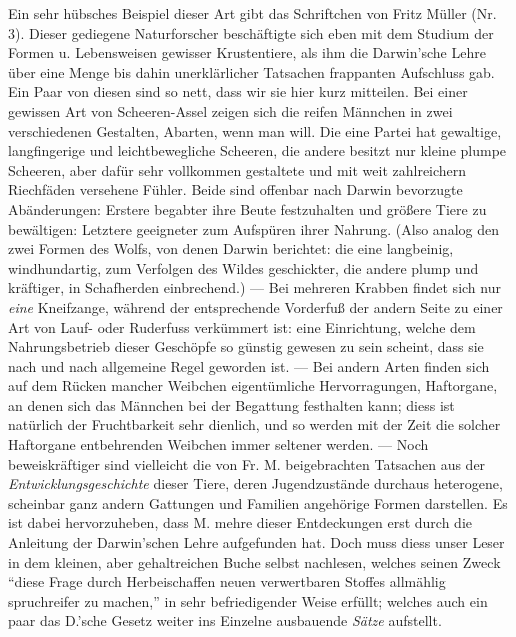 \documentclass[a4paper, 11pt, oneside, english]{article}
\begin{document}
Ein sehr hübsches Beispiel dieser Art gibt das Schriftchen von Fritz Müller (Nr. 3). Dieser gediegene Naturforscher beschäftigte sich eben mit dem Studium der Formen u. Lebensweisen gewisser Krustentiere, als ihm die Darwin'sche Lehre über eine Menge bis dahin unerklärlicher Tatsachen frappanten Aufschluss gab. Ein Paar von diesen sind so nett, dass wir sie hier kurz mitteilen. Bei einer gewissen Art von Scheeren-Assel zeigen sich die reifen Männchen in zwei verschiedenen Gestalten, Abarten, wenn man will. Die eine Partei hat gewaltige, langfingerige und leichtbewegliche Scheeren, die andere besitzt nur kleine plumpe Scheeren, aber dafür sehr vollkommen gestaltete und mit weit zahlreichern Riechfäden versehene Fühler. Beide sind offenbar nach Darwin bevorzugte Abänderungen: Erstere begabter ihre Beute festzuhalten und größere Tiere zu bewältigen: Letztere geeigneter zum Aufspüren ihrer Nahrung. (Also analog den zwei Formen des Wolfs, von denen Darwin berichtet: die eine langbeinig, windhundartig, zum Verfolgen des Wildes geschickter, die andere plump und kräftiger, in Schafherden einbrechend.) --- Bei mehreren Krabben findet sich nur \emph{eine} Kneifzange, während der entsprechende Vorderfuß der andern Seite zu einer Art von Lauf- oder Ruderfuss verkümmert ist: eine Einrichtung, welche dem Nahrungsbetrieb dieser Geschöpfe so günstig gewesen zu sein scheint, dass sie nach und nach allgemeine Regel geworden ist. --- Bei andern Arten finden sich auf dem Rücken mancher Weibchen eigentümliche Hervorragungen, Haftorgane, an denen sich das Männchen bei der Begattung festhalten kann; diess ist natürlich der Fruchtbarkeit sehr dienlich, und so werden mit der Zeit die solcher Haftorgane entbehrenden Weibchen immer seltener werden. --- Noch beweiskräftiger sind vielleicht die von Fr. M. beigebrachten Tatsachen aus der \emph{Entwicklungsgeschichte} dieser Tiere, deren Jugendzustände durchaus heterogene, scheinbar ganz andern Gattungen und Familien angehörige Formen darstellen. Es ist dabei hervorzuheben, dass M. mehre dieser Entdeckungen erst durch die Anleitung der Darwin'schen Lehre aufgefunden hat. Doch muss diess unser Leser in dem kleinen, aber gehaltreichen Buche selbst nachlesen, welches seinen Zweck "`diese Frage durch Herbeischaffen neuen verwertbaren Stoffes allmählig spruchreifer zu machen,"' in sehr befriedigender Weise erfüllt; welches auch ein paar das D.'sche Gesetz weiter ins Einzelne ausbauende \emph{Sätze} aufstellt.
\end{document}
